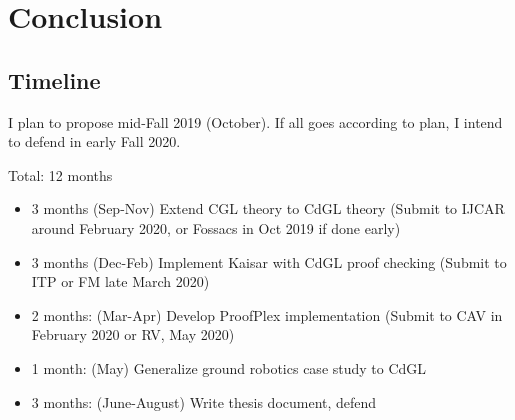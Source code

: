 \documentclass[12pt]{cmuthesis}
\theoremstyle{definition}
\theoremstyle{remark}
\newcommand{\CGL}{\textsf{CGL}\xspace}
\newcommand{\CdGL}{\textsf{CdGL}\xspace}
\newcommand{\ProofPlex}{ProofPlex\xspace}
\begin{document}
\chapter{Conclusion} 
\section{Timeline}
I plan to propose mid-Fall 2019 (October).
If all goes according to plan, I intend to defend in early Fall 2020.

Total: 12 months
\begin{itemize}
\item 3 months (Sep-Nov) Extend \CGL theory to \CdGL theory (Submit to IJCAR around February 2020, or Fossacs in Oct 2019 if done early)
\item 3 months (Dec-Feb) Implement Kaisar with \CdGL proof checking (Submit to ITP or FM late March 2020)
\item 2 months: (Mar-Apr) Develop \ProofPlex implementation (Submit to CAV in February 2020 or RV, May 2020) 
\item 1 month: (May) Generalize ground robotics case study to \CdGL
\item 3 months: (June-August) Write thesis document, defend
\end{itemize}

\appendix


\backmatter


\end{document}
